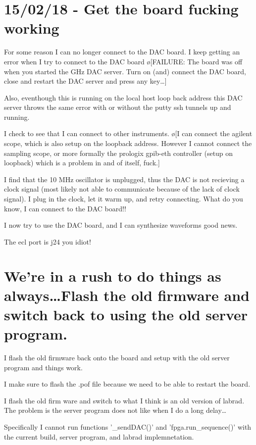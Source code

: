 \documentclass[10pt]{book}
\begin{document}
{\begin{enumerate}
\end{enumerate}

\section{15/02/18 - Get the board fucking working}
For some reason I can no longer connect to the DAC board. I keep getting an error when I try to connect to the DAC board \o[FAILURE: The board was off when you started the GHz DAC server. Turn on (and) connect the DAC board, close and restart the DAC server and press any key\ldots ]{}

Also, eventhough this is running on the local host loop back address this DAC server throws the same error with or without the putty ssh tunnels up and running.

I check to see that I can connect to other instruments. \o[I can connect the agilent scope, which is also setup on the loopback address. However I cannot connect the sampling scope, or more formally the prologix gpib-eth controller (setup on loopback) which is a problem in and of itself, fuck.]{}

I find that the 10 MHz oscillator is unplugged, thus the DAC is not recieving a clock signal (most likely not able to communicate because of the lack of clock signal). I plug in the clock, let it warm up, and retry connecting. What do you know, I can connect to the DAC board!!

I now try to use the DAC board, and I can synthesize waveforms good news.

The ecl port is j24 you idiot!

\section{We're in a rush to do things as always\ldots Flash the old firmware and switch back to using the old server program.}

I flash the old firmware back onto the board and setup with the old server program and things work.

I make sure to flash the .pof file because we need to be able to restart the board.

I flash the old firm ware and switch to what I think is an old version of labrad. The problem is the server program does not like when I do a long delay\ldots

Specifically I cannot run functions '\_sendDAC()' and 'fpga.run\_sequence()' with the current build, server program, and labrad implemnetation. 

}
\end{document}
